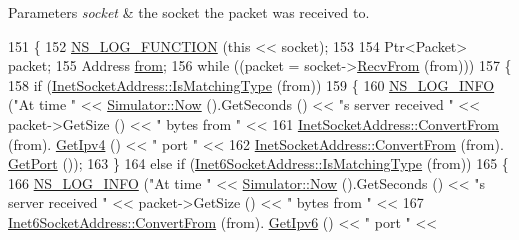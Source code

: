 \begin{DoxyParams}{Parameters}
{\em socket} & the socket the packet was received to. \\
\hline
\end{DoxyParams}

\begin{DoxyCode}
151 \{
152   \hyperlink{log-macros-disabled_8h_a90b90d5bad1f39cb1b64923ea94c0761}{NS\_LOG\_FUNCTION} (\textcolor{keyword}{this} << socket);
153 
154   Ptr<Packet> packet;
155   Address \hyperlink{lte__amc_8m_a1b4c81ff74eb1a626b5ade44c81004b3}{from};
156   \textcolor{keywordflow}{while} ((packet = socket->\hyperlink{classns3_1_1Socket_af22378d7af9a2745a9eada20210da215}{RecvFrom} (from)))
157     \{
158       \textcolor{keywordflow}{if} (\hyperlink{classns3_1_1InetSocketAddress_a9426766e34e928ce5dbdbeb9563a10df}{InetSocketAddress::IsMatchingType} (from))
159         \{
160           \hyperlink{group__logging_gafbd73ee2cf9f26b319f49086d8e860fb}{NS\_LOG\_INFO} (\textcolor{stringliteral}{"At time "} << \hyperlink{classns3_1_1Simulator_ac3178fa975b419f7875e7105be122800}{Simulator::Now} ().GetSeconds () << \textcolor{stringliteral}{"s server
       received "} << packet->GetSize () << \textcolor{stringliteral}{" bytes from "} <<
161                        \hyperlink{classns3_1_1InetSocketAddress_ade776b1109e7b9a7be0b22ced49931e3}{InetSocketAddress::ConvertFrom} (from).
      \hyperlink{classns3_1_1InetSocketAddress_a925d5288448467062884ce0363a63658}{GetIpv4} () << \textcolor{stringliteral}{" port "} <<
162                        \hyperlink{classns3_1_1InetSocketAddress_ade776b1109e7b9a7be0b22ced49931e3}{InetSocketAddress::ConvertFrom} (from).
      \hyperlink{classns3_1_1InetSocketAddress_ac1d62cfd1075b36df273b382c5bd3e14}{GetPort} ());
163         \}
164       \textcolor{keywordflow}{else} \textcolor{keywordflow}{if} (\hyperlink{classns3_1_1Inet6SocketAddress_a4d928c54affbfb530a12076d6d7e0540}{Inet6SocketAddress::IsMatchingType} (from))
165         \{
166           \hyperlink{group__logging_gafbd73ee2cf9f26b319f49086d8e860fb}{NS\_LOG\_INFO} (\textcolor{stringliteral}{"At time "} << \hyperlink{classns3_1_1Simulator_ac3178fa975b419f7875e7105be122800}{Simulator::Now} ().GetSeconds () << \textcolor{stringliteral}{"s server
       received "} << packet->GetSize () << \textcolor{stringliteral}{" bytes from "} <<
167                        \hyperlink{classns3_1_1Inet6SocketAddress_a2177c66e1bcf17c85dcffb9d2a971f5a}{Inet6SocketAddress::ConvertFrom} (from).
      \hyperlink{classns3_1_1Inet6SocketAddress_a19c83458e1e61d5accd19bec5afb254e}{GetIpv6} () << \textcolor{stringliteral}{" port "} <<

\end{DoxyCode}
